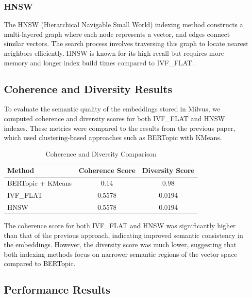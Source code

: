 \documentclass[12pt]{article}
\begin{document}
    \subsubsection{HNSW}
    The HNSW (Hierarchical Navigable Small World) indexing method constructs a multi-layered graph where each node represents a vector, and edges connect similar vectors. The search process involves traversing this graph to locate nearest neighbors efficiently. HNSW is known for its high recall but requires more memory and longer index build times compared to IVF\_FLAT.
    
    \subsection{Coherence and Diversity Results}
    
    To evaluate the semantic quality of the embeddings stored in Milvus, we computed coherence and diversity scores for both IVF\_FLAT and HNSW indexes. These metrics were compared to the results from the previous paper, which used clustering-based approaches such as BERTopic with KMeans.
    
    \begin{table}[h!]
        \centering
        \caption{Coherence and Diversity Comparison}
        \label{tab:coherence-diversity}
        \begin{tabular}{|l|c|c|}
            \hline
            \textbf{Method} & \textbf{Coherence Score} & \textbf{Diversity Score} \\ 
            \hline
            BERTopic + KMeans & 0.14 & 0.98 \\ 
            IVF\_FLAT                             & 0.5578 & 0.0194 \\ 
            HNSW                                  & 0.5578 & 0.0194 \\ 
            \hline
        \end{tabular}
    \end{table}
    
    The coherence score for both IVF\_FLAT and HNSW was significantly higher than that of the previous approach, indicating improved semantic consistency in the embeddings. However, the diversity score was much lower, suggesting that both indexing methods focus on narrower semantic regions of the vector space compared to BERTopic.
    
    \subsection{Performance Results}
    
\end{document}
